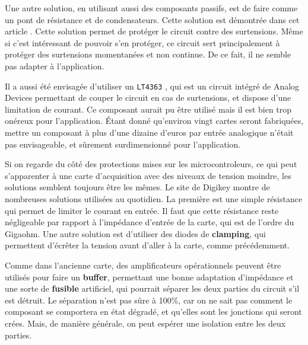 \documentclass{report}
\begin{document}
Une autre solution, en utilisant aussi des composants passifs, est de faire comme un pont de résistance et de condensateurs. Cette solution est démontrée dans cet article \cite{FilipovaPetrakieva2020}. Cette solution permet de protéger le circuit contre des surtensions. Même si c'est intéressant de pouvoir s'en protéger, ce circuit sert principalement à protéger des surtensions momentanées et non continue. De ce fait, il ne semble pas adapter à l'application.

Il a aussi été envisagée d'utiliser un \verb+LT4363+ \cite{LT4363AD}, qui est un circuit intégré de Analog Devices permettant de couper le circuit en cas de surtensions, et dispose d'une limitation de courant. Ce composant aurait pu être utilisé mais il est bien trop onéreux pour l'application. Étant donné qu'environ vingt cartes seront fabriquées, mettre un composant à plus d'une dizaine d'euros par entrée analogique n'était pas envisageable, et sûrement surdimensionné pour l'application.

Si on regarde du côté des protections mises sur les microcontroleurs, ce qui peut s'apparenter à une carte d'acquisition avec des niveaux de tension moindre, les solutions semblent toujours être les mêmes. Le site de Digikey \cite{digikey} montre de nombreuses solutions utilisées au quotidien. La première est une simple résistance qui permet de limiter le courant en entrée. Il faut que cette résistance reste négligeable par rapport à l'impédance d'entrée de la carte, qui est de l'ordre du Gigaohm. Une autre solution est d'utiliser des diodes de \textbf{clamping}, qui permettent d'écrêter la tension avant d'aller à la carte, comme précédemment.

Comme dans l'ancienne carte, des amplificateurs opérationnels peuvent être utilisés pour faire un \textbf{buffer}, permettant une bonne adaptation d'impédance et une sorte de \textbf{fusible} artificiel, qui pourrait séparer les deux parties du circuit s'il est détruit. Le séparation n'est pas sûre à 100$\%$, car on ne sait pas comment le composant se comportera en état dégradé, et qu'elles sont les jonctions qui seront crées. Mais, de manière générale, on peut espérer une isolation entre les deux parties.
\end{document}
